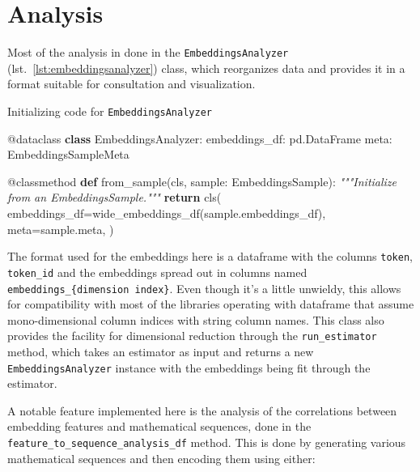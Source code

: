\documentclass[
  a4paper, twoside, 10pt, titlepage]{book}
\newenvironment{Shaded}{}{}
\newcommand{\AttributeTok}[1]{\textcolor[rgb]{0.49,0.56,0.16}{#1}}
\newcommand{\CommentTok}[1]{\textcolor[rgb]{0.38,0.63,0.69}{\textit{#1}}}
\newcommand{\ControlFlowTok}[1]{\textcolor[rgb]{0.00,0.44,0.13}{\textbf{#1}}}
\newcommand{\KeywordTok}[1]{\textcolor[rgb]{0.00,0.44,0.13}{\textbf{#1}}}
\newcommand{\NormalTok}[1]{#1}
\newcommand{\OperatorTok}[1]{\textcolor[rgb]{0.40,0.40,0.40}{#1}}
\begin{document}
\clearpage

\section{Analysis}\label{analysis}

Most of the analysis in done in the \texttt{EmbeddingsAnalyzer}
(lst.~\ref{lst:embeddingsanalyzer}) class, which reorganizes data and
provides it in a format suitable for consultation and visualization.

\begin{codelisting}

\caption{Initializing code for
\texttt{EmbeddingsAnalyzer}}\label{lst:embeddingsanalyzer}

\begin{Shaded}
\begin{Highlighting}[]
\AttributeTok{@dataclass}
\KeywordTok{class}\NormalTok{ EmbeddingsAnalyzer:}
\NormalTok{    embeddings\_df: pd.DataFrame}
\NormalTok{    meta: EmbeddingsSampleMeta}

    \AttributeTok{@classmethod}
    \KeywordTok{def}\NormalTok{ from\_sample(cls, sample: EmbeddingsSample):}
        \CommentTok{"""Initialize from an EmbeddingsSample."""}
        \ControlFlowTok{return}\NormalTok{ cls(}
\NormalTok{            embeddings\_df}\OperatorTok{=}\NormalTok{wide\_embeddings\_df(sample.embeddings\_df),}
\NormalTok{            meta}\OperatorTok{=}\NormalTok{sample.meta,}
\NormalTok{        )}
\end{Highlighting}
\end{Shaded}

\end{codelisting}

The format used for the embeddings here is a dataframe with the columns
\texttt{token}, \texttt{token\_id} and the embeddings spread out in
columns named \texttt{embeddings\_\{dimension\ index\}}. Even though
it's a little unwieldy, this allows for compatibility with most of the
libraries operating with dataframe that assume mono-dimensional column
indices with string column names. This class also provides the facility
for dimensional reduction through the \texttt{run\_estimator} method,
which takes an estimator as input and returns a new
\texttt{EmbeddingsAnalyzer} instance with the embeddings being fit
through the estimator.

A notable feature implemented here is the analysis of the correlations
between embedding features and mathematical sequences, done in the
\texttt{feature\_to\_sequence\_analysis\_df} method. This is done by
generating various mathematical sequences and then encoding them using
either:
\end{document}
